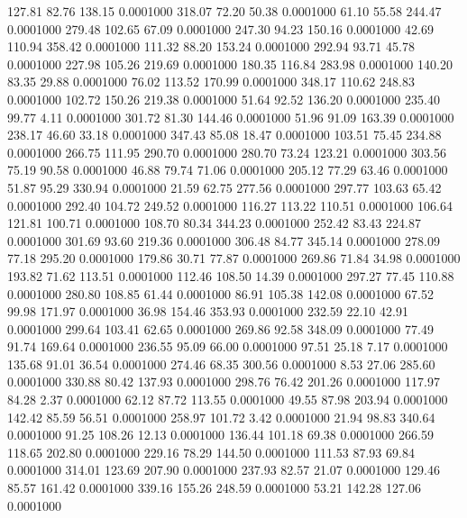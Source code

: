  127.81   82.76  138.15   0.0001000
 318.07   72.20   50.38   0.0001000
  61.10   55.58  244.47   0.0001000
 279.48  102.65   67.09   0.0001000
 247.30   94.23  150.16   0.0001000
  42.69  110.94  358.42   0.0001000
 111.32   88.20  153.24   0.0001000
 292.94   93.71   45.78   0.0001000
 227.98  105.26  219.69   0.0001000
 180.35  116.84  283.98   0.0001000
 140.20   83.35   29.88   0.0001000
  76.02  113.52  170.99   0.0001000
 348.17  110.62  248.83   0.0001000
 102.72  150.26  219.38   0.0001000
  51.64   92.52  136.20   0.0001000
 235.40   99.77    4.11   0.0001000
 301.72   81.30  144.46   0.0001000
  51.96   91.09  163.39   0.0001000
 238.17   46.60   33.18   0.0001000
 347.43   85.08   18.47   0.0001000
 103.51   75.45  234.88   0.0001000
 266.75  111.95  290.70   0.0001000
 280.70   73.24  123.21   0.0001000
 303.56   75.19   90.58   0.0001000
  46.88   79.74   71.06   0.0001000
 205.12   77.29   63.46   0.0001000
  51.87   95.29  330.94   0.0001000
  21.59   62.75  277.56   0.0001000
 297.77  103.63   65.42   0.0001000
 292.40  104.72  249.52   0.0001000
 116.27  113.22  110.51   0.0001000
 106.64  121.81  100.71   0.0001000
 108.70   80.34  344.23   0.0001000
 252.42   83.43  224.87   0.0001000
 301.69   93.60  219.36   0.0001000
 306.48   84.77  345.14   0.0001000
 278.09   77.18  295.20   0.0001000
 179.86   30.71   77.87   0.0001000
 269.86   71.84   34.98   0.0001000
 193.82   71.62  113.51   0.0001000
 112.46  108.50   14.39   0.0001000
 297.27   77.45  110.88   0.0001000
 280.80  108.85   61.44   0.0001000
  86.91  105.38  142.08   0.0001000
  67.52   99.98  171.97   0.0001000
  36.98  154.46  353.93   0.0001000
 232.59   22.10   42.91   0.0001000
 299.64  103.41   62.65   0.0001000
 269.86   92.58  348.09   0.0001000
  77.49   91.74  169.64   0.0001000
 236.55   95.09   66.00   0.0001000
  97.51   25.18    7.17   0.0001000
 135.68   91.01   36.54   0.0001000
 274.46   68.35  300.56   0.0001000
   8.53   27.06  285.60   0.0001000
 330.88   80.42  137.93   0.0001000
 298.76   76.42  201.26   0.0001000
 117.97   84.28    2.37   0.0001000
  62.12   87.72  113.55   0.0001000
  49.55   87.98  203.94   0.0001000
 142.42   85.59   56.51   0.0001000
 258.97  101.72    3.42   0.0001000
  21.94   98.83  340.64   0.0001000
  91.25  108.26   12.13   0.0001000
 136.44  101.18   69.38   0.0001000
 266.59  118.65  202.80   0.0001000
 229.16   78.29  144.50   0.0001000
 111.53   87.93   69.84   0.0001000
 314.01  123.69  207.90   0.0001000
 237.93   82.57   21.07   0.0001000
 129.46   85.57  161.42   0.0001000
 339.16  155.26  248.59   0.0001000
  53.21  142.28  127.06   0.0001000

